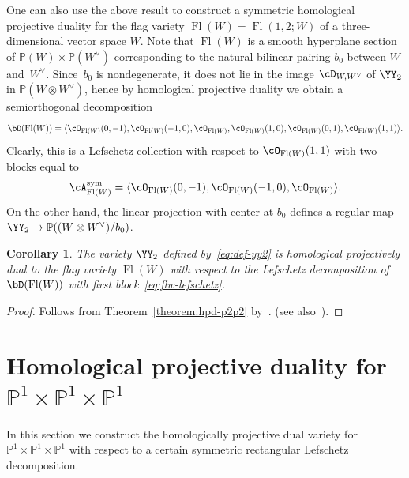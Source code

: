 \documentclass[11pt]{amsart}
\renewcommand{\P}{{\mathbb{P}}}
\DeclareMathOperator{\Fl}{\mathrm{Fl}}
\theoremstyle{plain}
\newtheorem{corollary}[theorem]{Corollary}
\theoremstyle{definition}
\theoremstyle{remark}
\begin{document}
One can also use the above result to construct a symmetric homological projective duality 
for the flag variety $\Fl(W) = \Fl(1,2;W)$ of a three-dimensional vector space $W$.
Note that $\Fl(W)$ is a smooth hyperplane section of $\P(W) \times \P(W^\vee)$ corresponding 
to the natural bilinear pairing $b_0$ between $W$ and~$W^\vee$.
Since~$b_0$ is nondegenerate, it does not lie in the image $\cD_{W,W^\vee}$ of $\YY_2$ in $\P(W \otimes W^\vee)$, 
hence by homological projective duality \cite[Theorem~6.3]{kuznetsov2007hpd} we obtain a semiorthogonal decomposition
\begin{equation*}
\bD(\Fl(W)) = \langle \cO_{\Fl(W)}(0,-1), \cO_{\Fl(W)}(-1,0), \cO_{\Fl(W)}, \cO_{\Fl(W)}(1,0), \cO_{\Fl(W)}(0,1), \cO_{\Fl(W)}(1,1) \rangle. 
\end{equation*}
Clearly, this is a Lefschetz collection with respect to $\cO_{\Fl(W)}(1,1)$ with two blocks equal to 
\begin{equation}\label{eq:flw-lefschetz}
\cA_{\Fl(W)}^{\rm{sym}} = \langle \cO_{\Fl(W)}(0,-1), \cO_{\Fl(W)}(-1,0), \cO_{\Fl(W)} \rangle. 
\end{equation}
On the other hand, the linear projection with center at $b_0$ defines a regular map $\YY_2 \to \P((W \otimes W^\vee)/b_0)$.

\begin{corollary}\label{corollary:hpd-fl3}
The variety ${\YY_2}$ defined by~\eqref{eq:def-yy2} is homological projectively dual to the flag variety $\Fl(W)$ with respect to the Lefschetz decomposition of $\bD(\Fl(W))$ with first block~\eqref{eq:flw-lefschetz}.
\end{corollary}
\begin{proof}
Follows from Theorem~\ref{theorem:hpd-p2p2} by~\cite[Theorem~3.4]{carocci2015homological}. 
(see also~\cite[Proposition~A.10]{kuznetsov2018cones}).
\end{proof}


\section{Homological projective duality for $\P^1 \times \P^1 \times \P^1$}\label{appendix:hpd-p1p1p1}

In this section we construct the homologically projective dual variety for $\P^1 \times \P^1 \times \P^1$ with respect to a certain symmetric rectangular Lefschetz decomposition.
\end{document}
